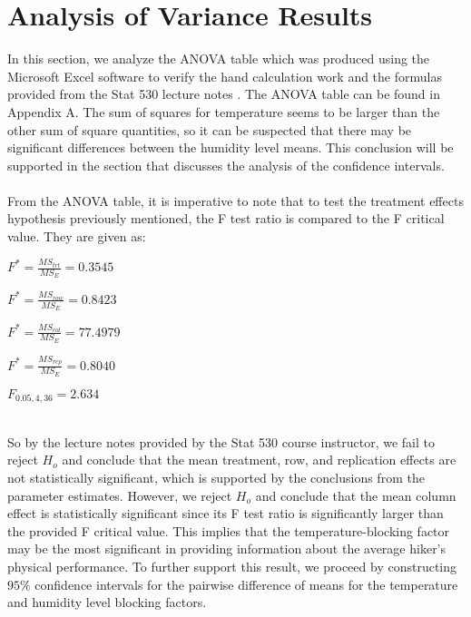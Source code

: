 \section{Analysis of Variance Results}
In this section, we analyze the ANOVA table which was produced using the Microsoft Excel software to verify the hand calculation work and the formulas provided from the Stat 530 lecture notes \cite{key3}. The ANOVA table can be found in Appendix A. The sum of squares for temperature seems to be larger than the other sum of square quantities, so it can be suspected that there may be significant differences between the humidity level means. This conclusion will be supported in the section that discusses the analysis of the confidence intervals.\\\\
From the ANOVA table, it is imperative to note that to test the treatment effects hypothesis previously mentioned, the F test ratio is compared to the F critical value. They are given as:\\
\centerline{$F^{*} = \frac{MS_{trt}}{MS_{E}} = 0.3545$}\newline
\centerline{$F^{*} = \frac{MS_{row}}{MS_{E}} = 0.8423$}\newline
\centerline{$F^{*} = \frac{MS_{col}}{MS_{E}} = 77.4979$}\newline
\centerline{$F^{*} = \frac{MS_{rep}}{MS_{E}} = 0.8040$}\newline
\centerline{$F_{0.05,4,36} = 2.634$}\\
So by the lecture notes provided by the Stat 530 course instructor, we fail to reject $H_o$ and conclude that the mean treatment, row, and replication effects are not statistically significant, which is supported by the conclusions from the parameter estimates.
However, we reject $H_{o}$ and conclude that the mean column effect is statistically significant since its F test ratio is significantly larger than the provided F critical value. This implies that the temperature-blocking factor may be the most significant in providing information about the average hiker's physical performance. To further support this result, we proceed by constructing $95\%$ confidence intervals for the pairwise difference of means for the temperature and humidity level blocking factors.

